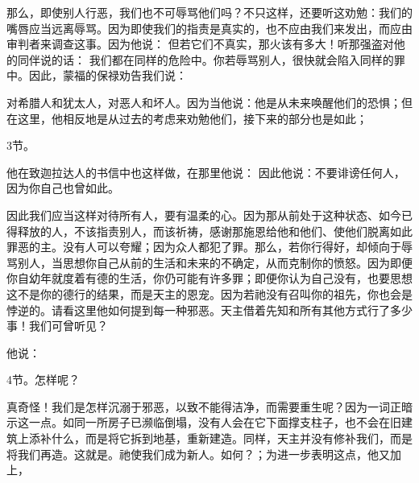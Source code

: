 那么，即使别人行恶，我们也不可辱骂他们吗？不只这样，还要听这劝勉：我们的嘴唇应当远离辱骂。因为即使我们的指责是真实的，也不应由我们来发出，而应由审判者来调查这事。因为他说：  但若它们不真实，那火该有多大！听那强盗对他的同伴说的话：  我们都在同样的危险中。你若辱骂别人，很快就会陷入同样的罪中。因此，蒙福的保禄劝告我们说： \par

\par

对希腊人和犹太人，对恶人和坏人。因为当他说：他是从未来唤醒他们的恐惧；但在这里，他相反地是从过去的考虑来劝勉他们，接下来的部分也是如此；\par

3节。 \par

他在致迦拉达人的书信中也这样做，在那里他说：  因此他说：不要诽谤任何人，因为你自己也曾如此。\par

\par

因此我们应当这样对待所有人，要有温柔的心。因为那从前处于这种状态、如今已得释放的人，不该指责别人，而该祈祷，感谢那施恩给他和他们、使他们脱离如此罪恶的主。没有人可以夸耀；因为众人都犯了罪。那么，若你行得好，却倾向于辱骂别人，当思想你自己从前的生活和未来的不确定，从而克制你的愤怒。因为即便你自幼年就度着有德的生活，你仍可能有许多罪；即便你认为自己没有，也要思想这不是你的德行的结果，而是天主的恩宠。因为若祂没有召叫你的祖先，你也会是悖逆的。请看这里他如何提到每一种邪恶。天主借着先知和所有其他方式行了多少事！我们可曾听见？\par

他说：\par

4节。怎样呢？ \par

真奇怪！我们是怎样沉溺于邪恶，以致不能得洁净，而需要重生呢？因为一词正暗示这一点。如同一所房子已濒临倒塌，没有人会在它下面撑支柱子，也不会在旧建筑上添补什么，而是将它拆到地基，重新建造。同样，天主并没有修补我们，而是将我们再造。这就是。祂使我们成为新人。如何？；为进一步表明这点，他又加上，\par


